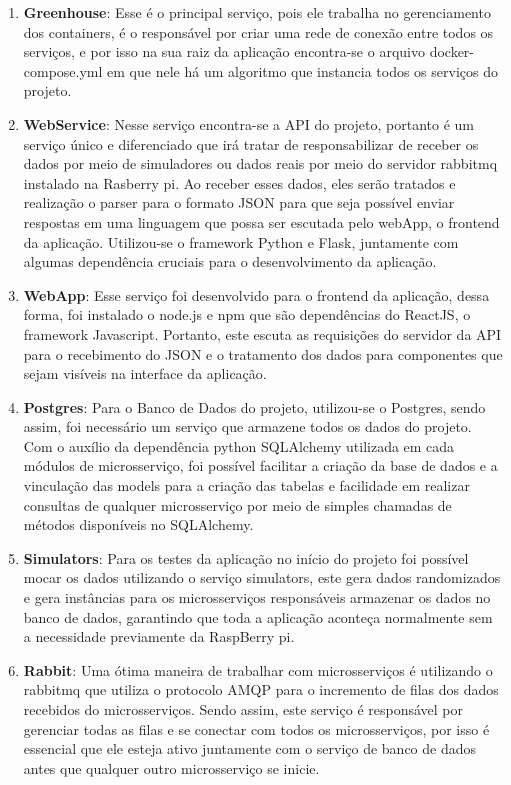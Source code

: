 \begin{enumerate}
	\item \textbf{Greenhouse}: Esse é o principal serviço, pois ele trabalha no gerenciamento dos containers, é o responsável por criar uma rede de conexão entre todos os serviços, e por isso na sua raiz da aplicação encontra-se o arquivo docker-compose.yml em que nele há um algoritmo que instancia todos os serviços do projeto.
	\item \textbf{WebService}: Nesse serviço encontra-se a API do projeto, portanto é um serviço único e diferenciado que irá tratar de responsabilizar de receber os dados por meio de simuladores ou dados reais por meio do servidor rabbitmq instalado na Rasberry pi. Ao receber esses dados, eles serão tratados e realização o parser para o formato JSON para que seja possível enviar respostas em uma linguagem que possa ser escutada pelo webApp, o frontend da aplicação. Utilizou-se o framework Python e Flask, juntamente com algumas dependência cruciais para o desenvolvimento da aplicação.
	\item \textbf{WebApp}: Esse serviço foi desenvolvido para o frontend da aplicação, dessa forma, foi instalado o node.js e npm que são dependências do ReactJS, o framework Javascript. Portanto, este escuta as requisições do servidor da API para o recebimento do JSON e o tratamento dos dados para componentes que sejam visíveis na interface da aplicação.
	\item \textbf{Postgres}: Para o Banco de Dados do projeto, utilizou-se o Postgres, sendo assim, foi necessário um serviço que armazene todos os dados do projeto. Com o auxílio da dependência python SQLAlchemy utilizada em cada módulos de microsserviço, foi possível facilitar a criação da base de dados e a vinculação das models para a criação das tabelas e facilidade em realizar consultas de qualquer microsserviço por meio de simples chamadas de métodos disponíveis no SQLAlchemy.
	\item \textbf{Simulators}: Para os testes da aplicação no início do projeto foi possível mocar os dados utilizando o serviço simulators, este gera dados randomizados e gera instâncias para os microsserviços responsáveis armazenar os dados no banco de dados, garantindo que toda a aplicação aconteça normalmente sem a necessidade previamente da RaspBerry pi.
	\item \textbf{Rabbit}: Uma ótima maneira de trabalhar com microsserviços é utilizando o rabbitmq que utiliza o protocolo AMQP para o incremento de filas dos dados recebidos do microsserviços. Sendo assim, este serviço é responsável por gerenciar todas as filas e se conectar com todos os microsserviços, por isso é essencial que ele esteja ativo juntamente com o serviço de banco de dados antes que qualquer outro microsserviço se inicie.

\end{enumerate}
